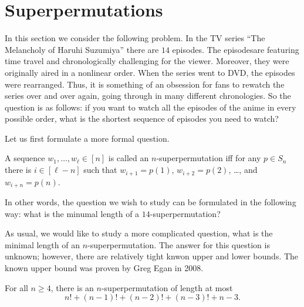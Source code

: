 \section{Superpermutations}
In this section we consider the following problem. In the TV series ``The
Melancholy of Haruhi Suzumiya'' there are $14$ episodes. The episodesare
featuring time travel and chronologically challenging for the viewer. Moreover,
they were originally aired in a nonlinear order. When the series went to DVD,
the episodes were rearranged. Thus, it is something of an obsession for fans to
rewatch the series over and over again, going through in many different
chronologies. So the question is as follows: if you want to watch all the
episodes of the anime in every possible order, what is the shortest sequence of
episodes you need to watch?

Let us first formulate a more formal question.
\begin{definition}
  A sequence $w_1, \dots, w_\ell \in [n]$ is called an $n$-superpermutation iff
  for any $p \in S_n$ there is $i \in [\ell - n]$ such that $w_{i + 1} = p(1)$,
  $w_{i + 2} = p(2)$, \dots, and $w_{i + n} = p(n)$.
\end{definition}
In other words, the question we wish to study can be formulated in the
following way: what is the minumal length of a $14$-superpermutation?

As usual, we would like to study a more complicated question, what is the
minimal length of an $n$-superpermutation. The answer for this question is
unknown; however, there are relatively tight knwon upper and lower bounds. The
known upper bound was proven by Greg Egan in 2008.
\begin{theorem}
  For all $n \ge 4$, there is an $n$-superpermutation of length at most
  \[
    n! + (n - 1)! + (n - 2)! + (n - 3)! + n - 3.
  \]
\end{theorem}

